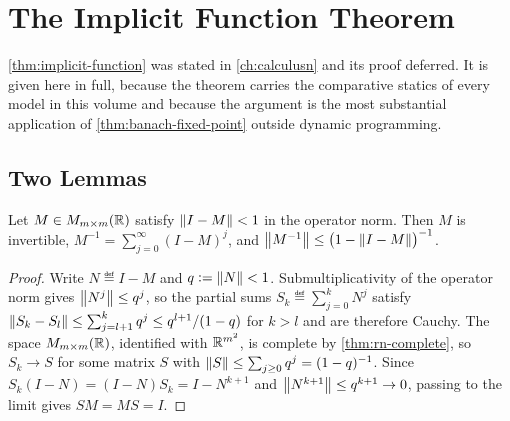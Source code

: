 
\chapter{The Implicit Function Theorem}\label{app:ift}

\autoref{thm:implicit-function} was stated in \autoref{ch:calculusn} and its
proof deferred. It is given here in full, because the theorem carries the
comparative statics of every model in this volume and because the argument is the
most substantial application of \autoref{thm:banach-fixed-point} outside dynamic
programming.

\section{Two Lemmas}\label{sec:app-ift-lemmas}

\begin{lemma}\label{lem:neumann}
	Let $M\in M_{m\times m}(\mathbb{R})$ satisfy $\left\lVert I-M\right\rVert<1$ in the operator norm. Then
	$M$ is invertible, $M^{-1}=\sum_{j=0}^{\infty}(I-M)^{j}$, and
	$\left\lVert M^{-1}\right\rVert\leq\bigl(1-\left\lVert I-M\right\rVert\bigr)^{-1}$.
\end{lemma}

\begin{proof}
	Write $N\eqdef I-M$ and $q\mathrel{\vcentcolon=}\left\lVert N\right\rVert<1$. Submultiplicativity of the operator
	norm gives $\left\lVert N^{j}\right\rVert\leq q^{j}$, so the partial sums
	$S_k\eqdef\sum_{j=0}^{k}N^{j}$ satisfy
	$\left\lVert S_k-S_l\right\rVert\leq\sum_{j=l+1}^{k}q^{j}\leq q^{l+1}/(1-q)$ for $k>l$ and are
	therefore Cauchy. The space $M_{m\times m}(\mathbb{R})$, identified with $\mathbb{R}^{m^{2}}$,
	is complete by \autoref{thm:rn-complete}, so $S_k\to S$ for some matrix $S$
	with $\left\lVert S\right\rVert\leq\sum_{j\geq0}q^{j}=(1-q)^{-1}$. Since
	$S_k(I-N)=(I-N)S_k=I-N^{k+1}$ and $\left\lVert N^{k+1}\right\rVert\leq q^{k+1}\to0$, passing to
	the limit gives $SM=MS=I$.
\end{proof}

